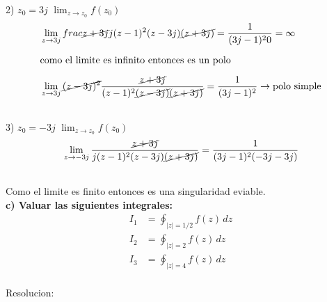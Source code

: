 \documentclass[12pt]{report}
\begin{document}
2) $z_0=3j$ \hspace{3cm} $\lim_{z \to z_0}f(z_0)$\\[10pt]

\begin{align*}
&\lim_{z \to 3j}frac{\cancel{z+3j}}{j(z - 1)^2(z-3j)\cancel{(z+3j)}}=\frac{1}{(3j-1)^20}=\infty\\[6pt]
&\text{como el limite es infinito entonces es un polo}\\[6pt]
&\lim_{z \to 3j}\cancel{(z - 3j)^2}\frac{\cancel{z+3j}}{(z - 1)^2\cancel{(z-3j)}\cancel{(z+3j)}}=\frac{1}{(3j-1)^2}\rightarrow \text{polo simple}\\[12pt]
\end{align*}


3) $z_0=-3j$ \hspace{3cm} $\lim_{z \to z_0}f(z_0)$\\[10pt]

\begin{align*}
&\lim_{z \to -3j}\frac{\cancel{z+3j}}{j(z - 1)^2(z-3j)\cancel{(z+3j)}}=\frac{1}{(3j-1)^2(-3j-3j)}\\[12pt]
\end{align*}

Como el limite es finito entonces es una singularidad eviable.\\

\textbf{c) Valuar las siguientes integrales:}\\[6pt]
\begin{align*}
    I_1 &= \oint_{|z|=1/2} f(z) \, dz \\[6pt]
    I_2 &= \oint_{|z|=2} f(z) \, dz \\[6pt]
    I_3 &= \oint_{|z|=4} f(z) \, dz\\[6pt]
\end{align*}

Resolucion:
\end{document}
